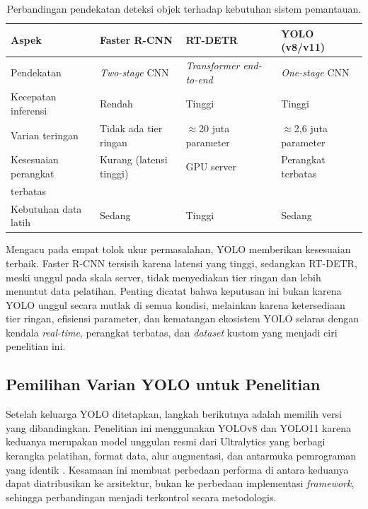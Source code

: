 \begin{table}[h]
    \centering
    \caption{Perbandingan pendekatan deteksi objek terhadap kebutuhan sistem pemantauan.}
    \label{tab:perbandingan_metode}
    \begin{tabular}{|p{3.0cm}|p{3.0cm}|p{3.0cm}|p{3.0cm}|}
        \hline
        \textbf{Aspek} & \textbf{Faster R-CNN} & \textbf{RT-DETR} & \textbf{YOLO (v8/v11)} \\
        \hline \hline
        Pendekatan & \textit{Two-stage} CNN & \textit{Transformer} \textit{end-to-end} & \textit{One-stage} CNN \\
        \hline
        Kecepatan inferensi & Rendah & Tinggi & Tinggi \\
        \hline
        Varian teringan & Tidak ada tier ringan & $\approx$20 juta parameter & $\approx$2,6 juta parameter \\
        \hline
        Kesesuaian perangkat & Kurang (latensi tinggi) & GPU server & Perangkat terbatas \\
        terbatas & & & \\
        \hline
        Kebutuhan data latih & Sedang & Tinggi & Sedang \\
        \hline
    \end{tabular}
\end{table}

Mengacu pada empat tolok ukur permasalahan, YOLO memberikan kesesuaian terbaik. Faster 
R-CNN tersisih karena latensi yang tinggi, sedangkan RT-DETR, meski unggul pada skala 
server, tidak menyediakan tier ringan dan lebih menuntut data pelatihan. Penting dicatat 
bahwa keputusan ini bukan karena YOLO unggul secara mutlak di semua kondisi, melainkan 
karena ketersediaan tier ringan, efisiensi parameter, dan kematangan ekosistem YOLO 
selaras dengan kendala \textit{real-time}, perangkat terbatas, dan \textit{dataset} 
kustom yang menjadi ciri penelitian ini.

\subsection{Pemilihan Varian YOLO untuk Penelitian}
\label{subsec:pemilihan_varian}

Setelah keluarga YOLO ditetapkan, langkah berikutnya adalah memilih versi yang 
dibandingkan. Penelitian ini menggunakan YOLOv8 dan YOLO11 karena keduanya merupakan model 
unggulan resmi dari Ultralytics yang berbagi kerangka pelatihan, format data, alur 
augmentasi, dan antarmuka pemrograman yang identik 
\cite{terven2023comprehensive, khanam2024yolov11}. Kesamaan ini membuat perbedaan 
performa di antara keduanya dapat diatribusikan ke arsitektur, bukan ke perbedaan 
implementasi \textit{framework}, sehingga perbandingan menjadi terkontrol secara 
metodologis.

